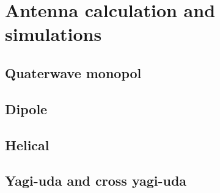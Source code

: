 \chapter{Antenna calculation and simulations}

\section{Quaterwave monopol}
\section{Dipole}
\section{Helical}
\section{Yagi-uda and cross yagi-uda}
